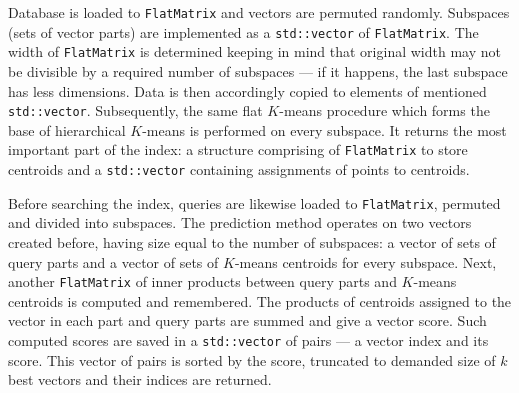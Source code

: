 Database is loaded to \texttt{FlatMatrix} and vectors are permuted randomly.
Subspaces (sets of vector parts) are implemented as a \texttt{std::vector} of \texttt{FlatMatrix}.
The width of \texttt{FlatMatrix} is determined keeping in mind that original width may not be
divisible by a required number of subspaces --- if it happens, the last subspace has less dimensions.
Data is then accordingly copied to elements of mentioned \texttt{std::vector}.
Subsequently, the same flat $K$-means procedure which forms the base of hierarchical $K$-means
is performed on every subspace. It returns the most important part of the index:
a structure comprising of \texttt{FlatMatrix} to store centroids and a \texttt{std::vector}
containing assignments of points to centroids.

Before searching the index, queries are likewise loaded to \texttt{FlatMatrix}, permuted and divided into subspaces.
The prediction method operates on two vectors created before, having size equal to the number of subspaces:
a vector of sets of query parts and a vector of sets of $K$-means centroids for every subspace.
Next, another \texttt{FlatMatrix} of inner products between query parts and $K$-means centroids
is computed and remembered.
The products of centroids assigned to the vector in each part and query parts are summed and give a vector score.
Such computed scores are saved in a \texttt{std::vector} of pairs --- a vector index and its score.
This vector of pairs is sorted by the score, truncated to demanded size of $k$ best vectors and their indices are returned.
